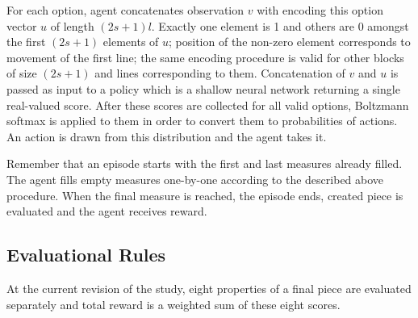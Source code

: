 \documentclass{article}
\begin{document}
For each option, agent concatenates observation $v$ with encoding this option vector $u$ of length $(2s + 1)l$. Exactly one element is 1 and others are 0 amongst the first $(2s + 1)$ elements of $u$; position of the non-zero element corresponds to movement of the first line; the same encoding procedure is valid for other blocks of size $(2s + 1)$ and lines corresponding to them. Concatenation of $v$ and $u$ is passed as input to a policy which is a shallow neural network returning a single real-valued score. After these scores are collected for all valid options, Boltzmann softmax is applied to them in order to convert them to probabilities of actions. An action is drawn from this distribution and the agent takes it.

Remember that an episode starts with the first and last measures already filled. The agent fills empty measures one-by-one according to the described above procedure. When the final measure is reached, the episode ends, created piece is evaluated and the agent receives reward.

\subsection{Evaluational Rules}
\label{subsec:setup}

At the current revision of the study, eight properties of a final piece are evaluated separately and total reward is a weighted sum of these eight scores.
\end{document}
